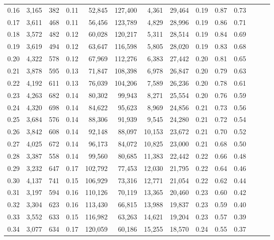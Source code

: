 \begin{tabular}{rrrrrrrrrrrrrr}
0.16 &  3,165 &  382 &  0.11 &   52,845 &  127,400 &   4,361 &  29,464 &  0.19 &  0.87 &      0.73 \\
0.17 &  3,611 &  468 &  0.11 &   56,456 &  123,789 &   4,829 &  28,996 &  0.19 &  0.86 &      0.71 \\
0.18 &  3,572 &  482 &  0.12 &   60,028 &  120,217 &   5,311 &  28,514 &  0.19 &  0.84 &      0.69 \\
0.19 &  3,619 &  494 &  0.12 &   63,647 &  116,598 &   5,805 &  28,020 &  0.19 &  0.83 &      0.68 \\
0.20 &  4,322 &  578 &  0.12 &   67,969 &  112,276 &   6,383 &  27,442 &  0.20 &  0.81 &      0.65 \\
0.21 &  3,878 &  595 &  0.13 &   71,847 &  108,398 &   6,978 &  26,847 &  0.20 &  0.79 &      0.63 \\
0.22 &  4,192 &  611 &  0.13 &   76,039 &  104,206 &   7,589 &  26,236 &  0.20 &  0.78 &      0.61 \\
0.23 &  4,263 &  682 &  0.14 &   80,302 &   99,943 &   8,271 &  25,554 &  0.20 &  0.76 &      0.59 \\
0.24 &  4,320 &  698 &  0.14 &   84,622 &   95,623 &   8,969 &  24,856 &  0.21 &  0.73 &      0.56 \\
0.25 &  3,684 &  576 &  0.14 &   88,306 &   91,939 &   9,545 &  24,280 &  0.21 &  0.72 &      0.54 \\
0.26 &  3,842 &  608 &  0.14 &   92,148 &   88,097 &  10,153 &  23,672 &  0.21 &  0.70 &      0.52 \\
0.27 &  4,025 &  672 &  0.14 &   96,173 &   84,072 &  10,825 &  23,000 &  0.21 &  0.68 &      0.50 \\
0.28 &  3,387 &  558 &  0.14 &   99,560 &   80,685 &  11,383 &  22,442 &  0.22 &  0.66 &      0.48 \\
0.29 &  3,232 &  647 &  0.17 &  102,792 &   77,453 &  12,030 &  21,795 &  0.22 &  0.64 &      0.46 \\
0.30 &  4,137 &  741 &  0.15 &  106,929 &   73,316 &  12,771 &  21,054 &  0.22 &  0.62 &      0.44 \\
0.31 &  3,197 &  594 &  0.16 &  110,126 &   70,119 &  13,365 &  20,460 &  0.23 &  0.60 &      0.42 \\
0.32 &  3,304 &  623 &  0.16 &  113,430 &   66,815 &  13,988 &  19,837 &  0.23 &  0.59 &      0.40 \\
0.33 &  3,552 &  633 &  0.15 &  116,982 &   63,263 &  14,621 &  19,204 &  0.23 &  0.57 &      0.39 \\
0.34 &  3,077 &  634 &  0.17 &  120,059 &   60,186 &  15,255 &  18,570 &  0.24 &  0.55 &      0.37 \\

\end{tabular}
